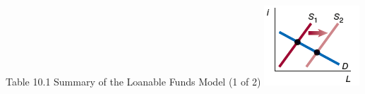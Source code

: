\documentclass[
  12pt,
  ignorenonframetext,
]{beamer}
\begin{document}
\begin{frame}{Table 10.1 Summary of the Loanable Funds Model (1 of 2)}
\includegraphics[width=\textwidth,height=0.99\textheight]{imgs3/img_slide31c.png}
\end{frame}
\end{document}
